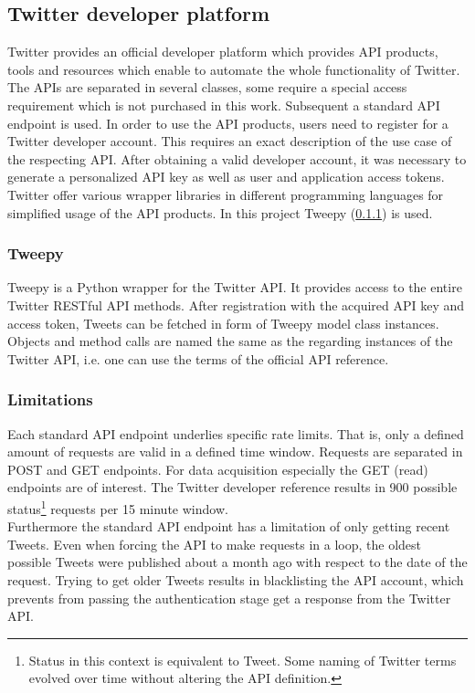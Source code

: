 \documentclass[conference]{IEEEtran}
\begin{document}
\subsection{Twitter developer platform}\label{subsec_twitter}

Twitter provides an official developer platform which provides API products, tools and resources which enable to automate the whole functionality of Twitter. The APIs are separated in several classes, some require a special access requirement which is not purchased in this work. Subsequent a standard API endpoint is used. In order to use the API products, users need to register for a Twitter developer account. This requires an exact description of the use case of the respecting API. After obtaining a valid developer account, it was necessary to generate a personalized API key as well as user and application access tokens. Twitter offer various wrapper libraries in different programming languages for simplified usage of the API products. In this project Tweepy (\ref{subsubsec_tweepy}) is used. \cite{tweepy}

\subsubsection{Tweepy}\label{subsubsec_tweepy}

Tweepy is a Python wrapper for the Twitter API. It provides access to the entire Twitter RESTful API methods. After registration with the acquired API key and access token, Tweets can be fetched in form of Tweepy model class instances. Objects and method calls are named the same as the regarding instances of the Twitter API, i.e. one can use the terms of the official API reference.

\subsubsection{Limitations}

Each standard API endpoint underlies specific rate limits. That is, only a defined amount of requests are valid in a defined time window. Requests are separated in POST and GET endpoints. For data acquisition especially the GET (read) endpoints are of interest. The Twitter developer reference results in 900 possible status\footnote{Status in this context is equivalent to Tweet. Some naming of Twitter terms evolved over time without altering the API definition.} requests per 15 minute window.\\
Furthermore the standard API endpoint has a limitation of only getting recent Tweets. Even when forcing the API to make requests in a loop, the oldest possible Tweets were published about a month ago with respect to the date of the request. Trying to get older Tweets results in blacklisting the API account, which prevents from passing the authentication stage get a response from the Twitter API. 
\end{document}
